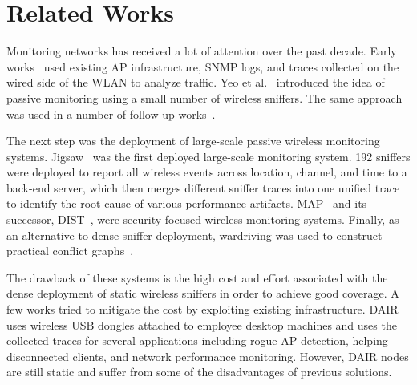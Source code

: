 \section{Related Works}
\label{sec:related}

Monitoring \wifi{} networks has received a lot of attention over the past
decade. Early works~\cite{chen:mccr2010,
henderson:mobicom2004,meng:mobicom2004,schwab:infocom2004} used existing AP
infrastructure, SNMP logs, and traces collected on the wired side of the WLAN to
analyze \wifi{} traffic. Yeo et al.~\cite{yeo-wise04,yeo:witmemo2005} introduced
the idea of passive monitoring using a small number of wireless sniffers. The
same approach was used in a number of follow-up works~\cite{jardosh:imc2005,
jardosh:wind2005}.

The next step was the deployment of large-scale passive wireless monitoring
systems. Jigsaw~\cite{jigsaw-sigcomm06,jigsaw-sigcomm07} was the first deployed
large-scale monitoring system. 192 sniffers were deployed to report all wireless
events across location, channel, and time to a back-end server, which then
merges different sniffer traces into one unified trace to identify the root
cause of various performance artifacts. MAP~\cite{sheng:wicom2008} and its
successor, DIST~\cite{tan:tmc2014}, were security-focused wireless monitoring
systems. Finally, as an alternative to dense sniffer deployment, wardriving was
used to construct practical conflict graphs~\cite{zhou:sigmetrics2013}.

The drawback of these systems is the high cost and effort associated with the
dense deployment of static wireless sniffers in order to achieve good coverage.
A few works tried to mitigate the cost by exploiting existing infrastructure.
DAIR~\cite{bahl2006enhancing,chan:nsdi2006} uses wireless USB dongles attached
to employee desktop machines and uses the collected traces for several
applications including rogue AP detection, helping disconnected clients, and
network performance monitoring. However, DAIR nodes are still static and suffer
from some of the disadvantages of previous solutions.


